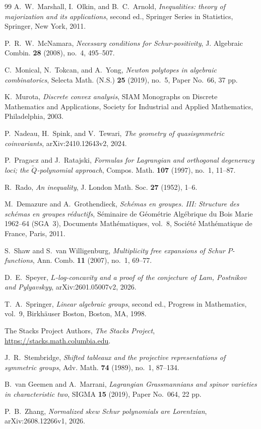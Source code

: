\documentclass[11pt,a4paper,oneside]{amsart}
\numberwithin{equation}{section}
\theoremstyle{definition}
\theoremstyle{remark}
\begin{document}
\begin{thebibliography}{99}
A.~W.~Marshall, I.~Olkin, and B.~C.~Arnold,
\emph{Inequalities: theory of majorization and its applications}, second ed.,
Springer Series in Statistics, Springer, New York, 2011.

P.~R.~W.~McNamara,
\emph{Necessary conditions for Schur-positivity},
J. Algebraic Combin. \textbf{28} (2008), no.~4, 495--507.

C.~Monical, N.~Tokcan, and A.~Yong,
\emph{Newton polytopes in algebraic combinatorics},
Selecta Math. (N.S.) \textbf{25} (2019), no.~5, Paper No.~66, 37 pp.

K.~Murota,
\emph{Discrete convex analysis},
SIAM Monographs on Discrete Mathematics and Applications,
Society for Industrial and Applied Mathematics, Philadelphia, 2003.

P.~Nadeau, H.~Spink, and V.~Tewari,
\emph{The geometry of quasisymmetric coinvariants},
arXiv:2410.12643v2, 2024.

P.~Pragacz and J.~Ratajski,
\emph{Formulas for Lagrangian and orthogonal degeneracy loci; the $\widetilde Q$-polynomial approach},
Compos. Math. \textbf{107} (1997), no.~1, 11--87.

R.~Rado,
\emph{An inequality},
J. London Math. Soc. \textbf{27} (1952), 1--6.

M.~Demazure and A.~Grothendieck,
\emph{Sch\'emas en groupes. III: Structure des sch\'emas en groupes r\'eductifs},
S\'eminaire de G\'eom\'etrie Alg\'ebrique du Bois Marie 1962--64 (SGA~3),
Documents Math\'ematiques, vol.~8, Soci\'et\'e Math\'ematique de France,
Paris, 2011.

S.~Shaw and S.~van Willigenburg,
\emph{Multiplicity free expansions of Schur $P$-functions},
Ann. Comb. \textbf{11} (2007), no.~1, 69--77.

D.~E.~Speyer,
\emph{$L$-log-concavity and a proof of the conjecture of Lam, Postnikov
and Pylyavskyy},
arXiv:2601.05007v2, 2026.

T.~A.~Springer,
\emph{Linear algebraic groups}, second ed.,
Progress in Mathematics, vol.~9, Birkh\"auser Boston, Boston, MA, 1998.

The Stacks Project Authors,
\emph{The Stacks Project},
\url{https://stacks.math.columbia.edu}.

J.~R.~Stembridge,
\emph{Shifted tableaux and the projective representations of symmetric groups},
Adv. Math. \textbf{74} (1989), no.~1, 87--134.

B.~van Geemen and A.~Marrani,
\emph{Lagrangian Grassmannians and spinor varieties in characteristic two},
SIGMA \textbf{15} (2019), Paper No.~064, 22 pp.

P.~B.~Zhang,
\emph{Normalized skew Schur polynomials are Lorentzian},
arXiv:2608.12266v1, 2026.

\end{thebibliography}
\end{document}

